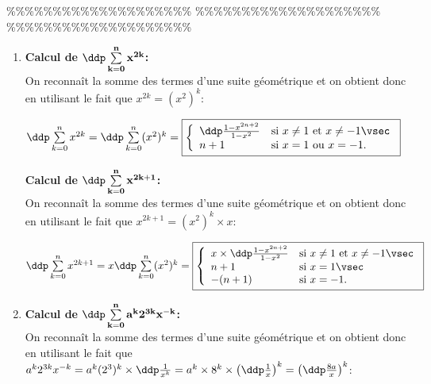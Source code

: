 \%\%\%\%\%\%\%\%\%\%\%\%\%\%\%\%\%\%\%\%
\%\%\%\%\%\%\%\%\%\%\%\%\%\%\%\%\%\%\%\%
\%\%\%\%\%\%\%\%\%\%\%\%\%\%\%\%\%\%\%\%




\begin{correction}   \;
\begin{enumerate}
\item \textbf{Calcul de $\mathbf{\ddp \sum\limits_{k=0}^{n} x^{2k}}$:}\\
\noindent On reconna\^{i}t la somme des termes d'une suite g\'eom\'etrique et on obtient donc en utilisant le fait que $x^{2k}=(x^2)^k$:\\
\noindent  
\begin{center}
$\ddp \sum\limits_{k=0}^{n} x^{2k}=\ddp \sum\limits_{k=0}^{n} (x^2)^{k}=\fbox{$\left\lbrace \begin{array}{ll}  \ddp\frac{1-x^{2n+2}}{1-x^2} & \hbox{si}\ x\not= 1\ \hbox{et}\ x\not=-1\vsec\\ n+1 & \hbox{si}\ x= 1\ \hbox{ou}\ x=-1.   \end{array}\right.$}$\\
\end{center}

\textbf{Calcul de $\mathbf{\ddp \sum\limits_{k=0}^{n} x^{2k+1}}$:}\\
\noindent On reconna\^{i}t la somme des termes d'une suite g\'eom\'etrique et on obtient donc en utilisant le fait que $x^{2k+1}=(x^2)^k\times x$:\\
\noindent \begin{center}
$\ddp \sum\limits_{k=0}^{n} x^{2k+1}=x\ddp \sum\limits_{k=0}^{n} (x^2)^{k}=\fbox{$\left\lbrace \begin{array}{ll}  x\times \ddp\frac{1-x^{2n+2}}{1-x^2} & \hbox{si}\ x\not= 1\ \hbox{et}\ x\not=-1\vsec\\ n+1 & \hbox{si}\ x= 1\vsec\\ -(n+1)& \hbox{si}\ x=-1.   \end{array}\right.$}$
\end{center}
\item  \textbf{Calcul de $\mathbf{\ddp \sum\limits_{k=0}^{n} a^k 2^{3k} x^{-k}}$:}\\
\noindent On reconna\^{i}t la somme des termes d'une suite g\'eom\'etrique et on obtient donc en utilisant le fait que $a^k 2^{3k} x^{-k}=a^k(2^3)^k\times \ddp\frac{1}{x^k}=a^k\times 8^k\times \left(\ddp\frac{1}{x} \right)^k=\left(\ddp\frac{8a}{x} \right)^k$:\\


\end{enumerate}
\end{correction}
